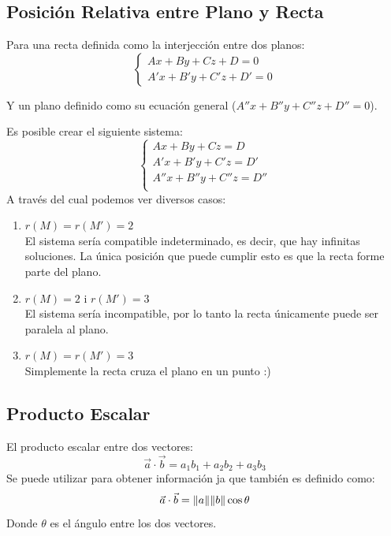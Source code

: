 \documentclass[arial,a4paper,print]{article}
\begin{document}
\pagebreak
\subsection{Posición Relativa entre Plano y Recta}

Para una recta definida como la interjección entre dos planos:
\begin{equation*}
	\begin{cases}
		Ax + By + Cz + D = 0 \\
		A'x + B'y + C'z + D' = 0 
	\end{cases}
\end{equation*}

Y un plano definido como su ecuación general ($ A''x + B''y + C''z + D'' = 0 $).

Es posible crear el siguiente sistema:
\begin{equation*}
	\begin{cases}
		Ax + By + Cz = D \\
		A'x + B'y + C'z = D' \\
		A''x + B''y + C''z = D'' \\
	\end{cases}
\end{equation*}
A través del cual podemos ver diversos casos:
\begin{enumerate}
	\item $r(M) = r(M') = 2$\\
	El sistema sería compatible indeterminado, es decir, que hay infinitas soluciones. La única posición que puede cumplir esto es que la recta forme parte del plano. 
	
	\item $r(M) = 2$ i $r(M') = 3$\\
	El sistema sería incompatible, por lo tanto la recta únicamente puede ser paralela al plano.
	
	\item $r(M) = r(M') = 3$\\
	Simplemente la recta cruza el plano en un punto :)
	
\end{enumerate}

\subsection{Producto Escalar}
El producto escalar entre dos vectores:
\begin{equation*}
	\vec{a} \cdot \vec{b} = a_{1}b_{1} + a_{2}b_{2} + a_{3}b_{3}
\end{equation*}
Se puede utilizar para obtener información ja que también es definido como:
\begin{equation*}
	\vec{a} \cdot \vec{b} = \norm{a}\norm{b}\cos \theta
\end{equation*}
Donde $\theta$ es el ángulo entre los dos vectores. 
\end{document}
